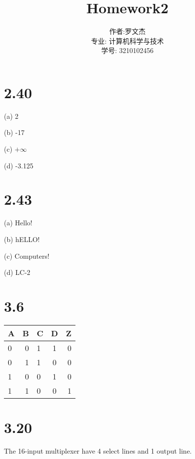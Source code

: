 \documentclass[20pt]{ctexart}
\title{Homework2}
\author{作者:罗文杰\\专业: 计算机科学与技术\\学号: 3210102456}
\date{}
\begin{document}
\maketitle

\section*{2.40}
(a) 2

(b) -17

(c) $+\infty$

(d) -3.125

\section*{2.43}
(a) Hello!

(b) hELLO!

(c) Computers!

(d) LC-2

\section*{3.6}
\begin{table}[H]
\centering
\begin{tabular}{lr|lcr}
    \hline
    A & B & C & D & Z \\
    \hline
    0 & 0 & 1 & 1 & 0 \\
    0 & 1 & 1 & 0 & 0 \\
    1 & 0 & 0 & 1 & 0 \\
    1 & 1 & 0 & 0 & 1 \\
    \hline
    \end{tabular}
    \end{table}

\section*{3.20}
The 16-input multiplexer have 4 select lines and 1 output line.
\end{document}
